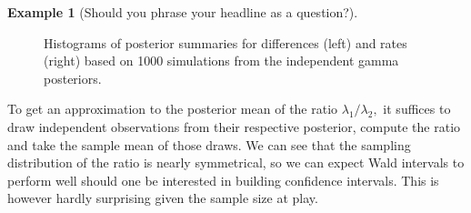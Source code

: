 \documentclass[
  11pt,
  letterpaper,
]{scrbook}
\theoremstyle{definition}
\newtheorem{example}{Example}[chapter]
\theoremstyle{definition}
\theoremstyle{definition}
\theoremstyle{plain}
\theoremstyle{remark}
\begin{document}
\begin{example}[Should you phrase your headline as a
question?]
\begin{figure}[ht!]
{}

\caption{\label{fig-hist-difference_rates}Histograms of posterior
summaries for differences (left) and rates (right) based on 1000
simulations from the independent gamma posteriors.}

\end{figure}

To get an approximation to the posterior mean of the ratio
\(\lambda_1/\lambda_2,\) it suffices to draw independent observations
from their respective posterior, compute the ratio and take the sample
mean of those draws. We can see that the sampling distribution of the
ratio is nearly symmetrical, so we can expect Wald intervals to perform
well should one be interested in building confidence intervals. This is
however hardly surprising given the sample size at play.

\end{example}
\end{document}
